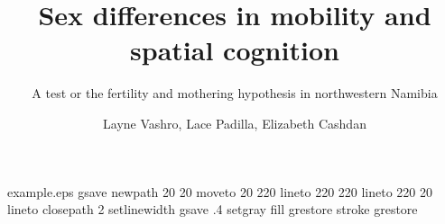 %
%
%
%
%
\begin{filecontents*}{example.eps}
gsave
newpath
  20 20 moveto
  20 220 lineto
  220 220 lineto
  220 20 lineto
closepath
2 setlinewidth
gsave
  .4 setgray fill
grestore
stroke
grestore
\end{filecontents*}
%
\RequirePackage{fix-cm}
%
\documentclass[smallextended]{svjour3}       %
%
\smartqed  %
%
\usepackage{graphicx}
\usepackage{natbib}

%
%
%
%
%


\title{Sex differences in mobility and spatial cognition%
}
\subtitle{A test or the fertility and mothering hypothesis in northwestern Namibia}


\author{Layne Vashro, Lace Padilla, Elizabeth Cashdan
}


